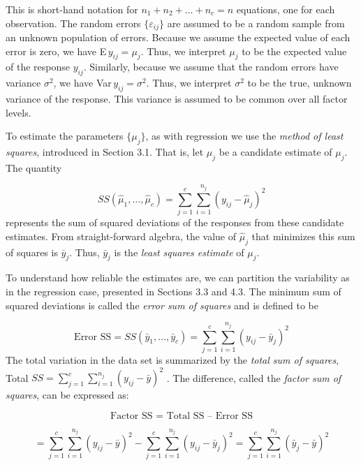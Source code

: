 This is short-hand notation for $n_1+n_2+\ldots +n_{c}=n$ equations,
one for each observation. The random errors $\{ \varepsilon_{ij} \}$
are assumed to be a random sample from an unknown population of
errors. Because we assume the expected value of each error is zero,
we have E$\,y_{ij}=\mu_{j}$. Thus, we interpret $\mu_{j}$ to be the
expected value of the response $y_{ij}$. Similarly, because we
assume that the random errors have variance $\sigma ^{2}$, we have
Var$\,y_{ij}=\sigma ^{2}$. Thus, we interpret $\sigma ^{2}$ to be
the true, unknown variance of the response. This variance is assumed
to be common over all factor levels.

To estimate the parameters $\{\mu_{j}\}$, as with regression we use
the \textit{method of least squares}, introduced in Section 3.1.
That is, let $\hat{\mu}_j$ be a candidate estimate of $\mu_{j}$. The
quantity

\begin{equation*}
SS(\hat{\mu}_1,\ldots
,\hat{\mu}_{c})=\sum_{j=1}^{c}\sum_{i=1}^{n_{j}}(y_{ij}-\hat{\mu}_{j})^{2}
\end{equation*}%
represents the sum of squared deviations of the responses from these
candidate estimates. From straight-forward algebra, the value of
$\hat{\mu}_j$ that minimizes this sum of squares is $\bar{y}_{j}$.
Thus, $\bar{y}_{j}$ is the \textit{least squares estimate }of $\mu
_{j}$.

To understand how reliable the estimates are, we can partition the
variability as in the regression case, presented in Sections 3.3 and 4.3.
The minimum sum of squared deviations is called the \textit{error sum of
squares} and is defined to be

\begin{equation*}
\text{Error SS}=SS(\bar{y}_1,\ldots ,\bar{y}_{c})=\sum_{j=1}^{c}%
\sum_{i=1}^{n_{j}}(y_{ij}-\bar{y}_{j})^{2}
\end{equation*}%
The total variation in the data set is summarized by the \textit{total sum
of squares}, Total $SS=\sum_{j=1}^{c}\sum_{i=1}^{n_{j}}(y_{ij}-\bar{y})^{2}$%
. The difference, called the \textit{factor sum of} \textit{squares}, can be
expressed as:

\begin{equation*}
\text{Factor SS = Total SS -- Error SS}
\end{equation*}

\begin{equation*}
=\sum_{j=1}^{c}\sum_{i=1}^{n_{j}}(y_{ij}-\bar{y})^{2}-\sum_{j=1}^{c}%
\sum_{i=1}^{n_{j}}(y_{ij}-\bar{y}_{j})^{2}=\sum_{j=1}^{c}\sum_{i=1}^{n_{j}}(%
\bar{y}_{j}-\bar{y})^{2}
\end{equation*}


